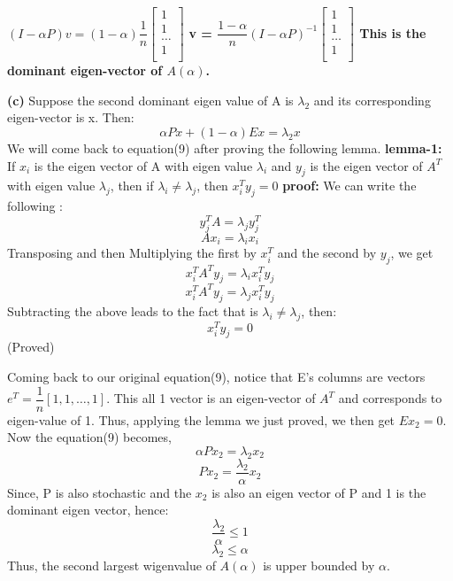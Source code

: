 \documentclass{article}
\renewcommand\part[1]{\vspace{.10in}\textbf{(#1)}}
\begin{document}
  $(I - \alpha P)v = (1 - \alpha)\dfrac{1}{n} \begin{bmatrix}
	  			   1 \\
	  			   1 \\
	  			   \dots \\
	  			   1 \\
	  			 \end{bmatrix}$ \newline
  \bf v = $\dfrac{1-\alpha}{n} (I - \alpha P)^{-1}\begin{bmatrix}
	  			   1 \\
	  			   1 \\
	  			   \dots \\
	  			   1 \\
  \end{bmatrix}$ \textbf {This is the dominant eigen-vector of $A(\alpha)$}. \newline

  \part{c} Suppose the second dominant eigen value of A is $\lambda_2$ and its corresponding eigen-vector is x. Then: 
  \begin{equation}
	  \alpha Px + (1-\alpha)Ex = \lambda_2 x
  \end{equation}
  We will come back to equation(9) after proving the following lemma. \newline
  \textbf {lemma-1:} If $x_i$ is the eigen vector of A with eigen value $\lambda_i$ and $y_j$ is the eigen vector of $A^T$ with eigen value $\lambda_j$, then if $\lambda_i \neq \lambda_j$, then $x_{i}^Ty_j = 0$ \newline
  \textbf {proof:} We can write the following :
  \[ y_{j}^TA = \lambda_{j}y_{j}^T \]
  \[ Ax_{i} = \lambda_{i}x_{i}\]
  Transposing and then Multiplying the first by $x_{i}^T$ and the second by $y_j$, we get
  \[ x_{i}^TA^Ty_j = \lambda_ix_{i}^Ty_j\]
  \[ x_{i}^TA^Ty_j = \lambda_jx_{i}^Ty_j\]
  Subtracting the above leads to the fact that is $\lambda_i \neq \lambda_j$, then:
  \[x_{i}^Ty_{j} = 0\]
  (Proved) \newline

  Coming back to our original equation(9), notice that E's columns are vectors $e^T=\dfrac{1}{n}[1,1, \dots, 1]$. This all 1 vector is an eigen-vector of $A^T$ and corresponds to eigen-value of 1. Thus, applying the lemma we just proved, we then get $Ex_2=0$. Now the equation(9) becomes, 
  \[\alpha Px_2 = \lambda_2 x_2 \]
  \[Px_2 = \dfrac{\lambda_2}{\alpha }x_2\]
  Since, P is also stochastic and the $x_2$ is also an eigen vector of P and 1 is the dominant eigen vector, hence: \newline
  \[\dfrac{\lambda_2}{\alpha} \leq 1\]
  \[\lambda_2 \leq \alpha\]
  Thus, the second largest wigenvalue of $A(\alpha)$ is upper bounded by $\alpha$. \newline
\end{document}
